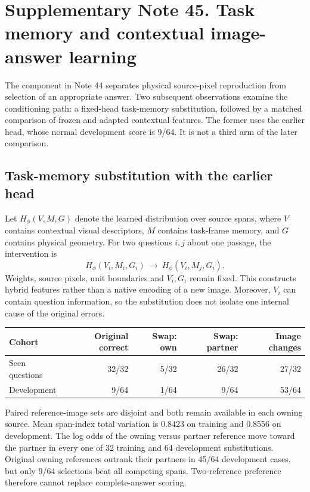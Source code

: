 \clearpage
\section*{Supplementary Note 45. Task memory and contextual image-answer learning}

The component in Note 44 separates physical source-pixel reproduction from
selection of an appropriate answer. Two subsequent observations examine the
conditioning path: a fixed-head task-memory substitution, followed by a
matched comparison of frozen and adapted contextual features. The former
uses the earlier head, whose normal development score is 9/64. It is not a
third arm of the later comparison.

\subsection*{Task-memory substitution with the earlier head}
Let $H_\phi(V,M,G)$ denote the learned distribution over source spans, where
$V$ contains contextual visual descriptors, $M$ contains task-frame memory,
and $G$ contains physical geometry. For two questions $i,j$ about one
passage, the intervention is
\[
 H_\phi(V_i,M_i,G_i)\ \longrightarrow\ H_\phi(V_i,M_j,G_i).
\]
Weights, source pixels, unit boundaries and $V_i,G_i$ remain fixed. This
constructs hybrid features rather than a native encoding of a new image.
Moreover, $V_i$ can contain question information, so the substitution does
not isolate one internal cause of the original errors.

\begin{center}\small
\begin{tabular}{lrrrr}
\toprule
Cohort & Original correct & Swap: own & Swap: partner & Image changes\\
\midrule
Seen questions & 32/32 & 5/32 & 26/32 & 27/32\\
Development & 9/64 & 1/64 & 9/64 & 53/64\\
\bottomrule
\end{tabular}
\end{center}
Paired reference-image sets are disjoint and both remain available in each
owning source. Mean span-index total variation is 0.8423 on training and
0.8556 on development. The log odds of the owning versus partner reference
move toward the partner in every one of 32 training and 64 development
substitutions. Original owning references outrank their partners in 45/64
development cases, but only 9/64 selections beat all competing spans.
Two-reference preference therefore cannot replace complete-answer scoring.

